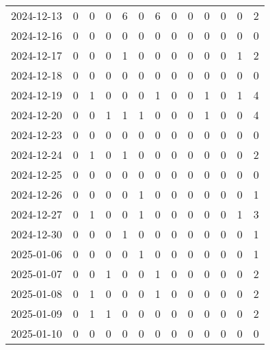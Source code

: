 \documentclass[dvipdfmx,oneside]{article}
\begin{document}
\begin{longtable}{lcccccccccccc}
        2024-12-13 &     0 &     0 &     0 &     6 &     0 &     6 &     0 &     0 &     0 &     0 &     0 &      2 \\
        2024-12-16 &     0 &     0 &     0 &     0 &     0 &     0 &     0 &     0 &     0 &     0 &     0 &      0 \\
        2024-12-17 &     0 &     0 &     0 &     1 &     0 &     0 &     0 &     0 &     0 &     0 &     1 &      2 \\
        2024-12-18 &     0 &     0 &     0 &     0 &     0 &     0 &     0 &     0 &     0 &     0 &     0 &      0 \\
        2024-12-19 &     0 &     1 &     0 &     0 &     0 &     1 &     0 &     0 &     1 &     0 &     1 &      4 \\
        2024-12-20 &     0 &     0 &     1 &     1 &     1 &     0 &     0 &     0 &     1 &     0 &     0 &      4 \\
        2024-12-23 &     0 &     0 &     0 &     0 &     0 &     0 &     0 &     0 &     0 &     0 &     0 &      0 \\
        2024-12-24 &     0 &     1 &     0 &     1 &     0 &     0 &     0 &     0 &     0 &     0 &     0 &      2 \\
        2024-12-25 &     0 &     0 &     0 &     0 &     0 &     0 &     0 &     0 &     0 &     0 &     0 &      0 \\
        2024-12-26 &     0 &     0 &     0 &     0 &     1 &     0 &     0 &     0 &     0 &     0 &     0 &      1 \\
        2024-12-27 &     0 &     1 &     0 &     0 &     1 &     0 &     0 &     0 &     0 &     0 &     1 &      3 \\
        2024-12-30 &     0 &     0 &     0 &     1 &     0 &     0 &     0 &     0 &     0 &     0 &     0 &      1 \\
        2025-01-06 &     0 &     0 &     0 &     0 &     1 &     0 &     0 &     0 &     0 &     0 &     0 &      1 \\
        2025-01-07 &     0 &     0 &     1 &     0 &     0 &     1 &     0 &     0 &     0 &     0 &     0 &      2 \\
        2025-01-08 &     0 &     1 &     0 &     0 &     0 &     1 &     0 &     0 &     0 &     0 &     0 &      2 \\
        2025-01-09 &     0 &     1 &     1 &     0 &     0 &     0 &     0 &     0 &     0 &     0 &     0 &      2 \\
        2025-01-10 &     0 &     0 &     0 &     0 &     0 &     0 &     0 &     0 &     0 &     0 &     0 &      0 \\

\end{longtable}
\end{document}
